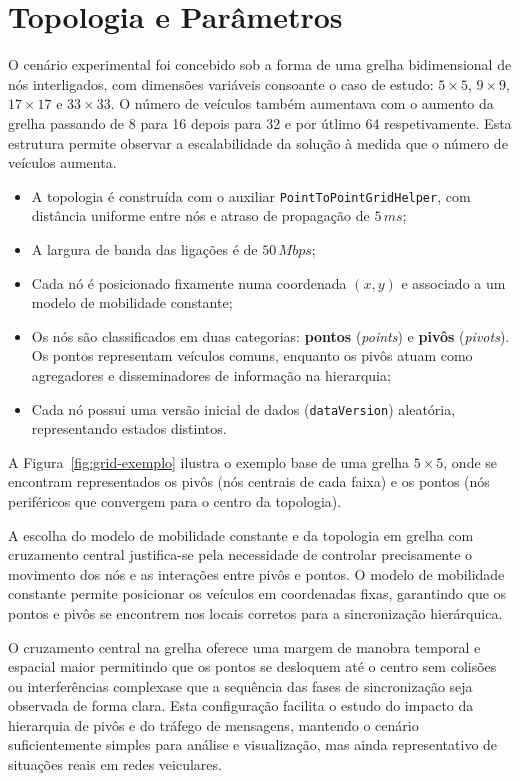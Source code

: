 \section{Topologia e Parâmetros}

O cenário experimental foi concebido sob a forma de uma grelha bidimensional de nós interligados, com dimensões variáveis consoante o caso de estudo: $5\times5$, $9\times9$, $17\times17$ e $33\times33$.  O número de veículos também aumentava com o aumento da grelha passando de 8 para 16 depois para 32 e por útlimo 64 respetivamente. Esta estrutura permite observar a escalabilidade da solução à medida que o número de veículos aumenta.

\begin{itemize}
    \item A topologia é construída com o auxiliar \texttt{PointToPointGridHelper}, com distância uniforme entre nós e atraso de propagação de $5\,ms$;
    \item A largura de banda das ligações é de $50\,Mbps$;
    \item Cada nó é posicionado fixamente numa coordenada $(x, y)$ e associado a um modelo de mobilidade constante;
    \item Os nós são classificados em duas categorias: \textbf{pontos} (\textit{points}) e \textbf{pivôs} (\textit{pivots}). Os pontos representam veículos comuns, enquanto os pivôs atuam como agregadores e disseminadores de informação na hierarquia;
    \item Cada nó possui uma versão inicial de dados (\texttt{dataVersion}) aleatória, representando estados distintos.
\end{itemize}

A Figura~\ref{fig:grid-exemplo} ilustra o exemplo base de uma grelha $5\times5$, onde se encontram representados os pivôs (nós centrais de cada faixa) e os pontos (nós periféricos que convergem para o centro da topologia).  

A escolha do modelo de mobilidade constante e da topologia em grelha com cruzamento central justifica-se pela necessidade de controlar precisamente o movimento dos nós e as interações entre pivôs e pontos. O modelo de mobilidade constante permite posicionar os veículos em coordenadas fixas, garantindo que os pontos e pivôs se encontrem nos locais corretos para a sincronização hierárquica.  

O cruzamento central na grelha oferece uma margem de manobra temporal e espacial maior permitindo que os pontos se desloquem até o centro sem colisões ou interferências complexase que a sequência das fases de sincronização seja observada de forma clara. Esta configuração facilita o estudo do impacto da hierarquia de pivôs e do tráfego de mensagens, mantendo o cenário suficientemente simples para análise e visualização, mas ainda representativo de situações reais em redes veiculares.

